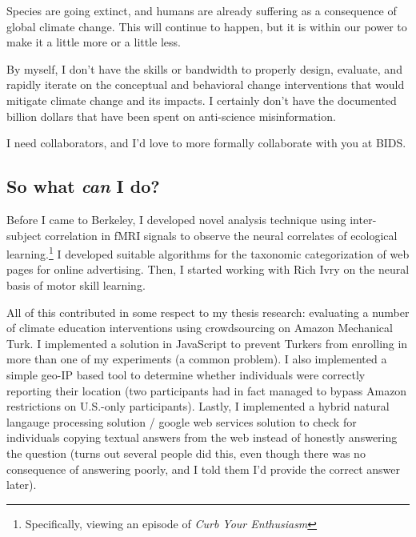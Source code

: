 Species are going extinct, %
and humans are already suffering as a consequence of global climate change. %
This will continue to happen, but it is within our power to make it a little
more or a little less.

By myself, I don't have the skills or bandwidth to properly design, evaluate, and rapidly
iterate on the conceptual and behavioral change interventions that would
mitigate climate change and its impacts. I certainly don't have the documented
billion dollars that have been spent on anti-science misinformation.

I need collaborators, and I'd love to more formally collaborate with you at BIDS.

\subsection*{So what \emph{can} I do?}


Before I came to Berkeley, I developed novel analysis technique using
inter-subject correlation in fMRI signals to observe the neural correlates of
ecological learning.\footnote{Specifically, viewing an episode of \emph{Curb
Your Enthusiasm}} I developed suitable algorithms for the taxonomic
categorization of web pages for online advertising. Then, I started working with
Rich Ivry on the neural basis of motor skill learning.

All of this contributed in some respect to my thesis research: evaluating a
number of climate education interventions using crowdsourcing on Amazon
Mechanical Turk. I implemented a solution in JavaScript to prevent Turkers from
enrolling in more than one of my experiments (a common problem). %
I also implemented a simple geo-IP based tool to determine whether individuals
were correctly reporting their location (two participants had in fact managed to
bypass Amazon restrictions on U.S.-only participants). Lastly, I implemented a
hybrid natural langauge processing solution / google web services solution to
check for individuals copying textual answers from the web instead of honestly
answering the question (turns out several people did this, even though there was
no consequence of answering poorly, and I told them I'd provide the correct
answer later).

